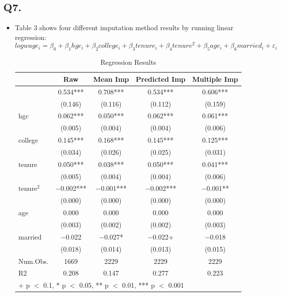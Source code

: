 \documentclass{article}
\begin{document}
\subsection*{Q7.}
	\begin{itemize}
		\item Table 3 shows four different imputation method results by running linear regression:
		\begin{equation}
			logwage_{i} = \beta_{0} + \beta_{1}hgc_{i} + \beta_{2}college_{i} + \beta_{3}tenure_{i} + \beta_{4}tenure^{2} + \beta_{5}age_{i} + \beta_{6}married_{i} + \varepsilon_{i}
		\end{equation}
		\begin{table}[h]
			\centering
			\caption{Regression Results}
			\begin{tabular}[t]{lcccc}\toprule  & Raw & Mean Imp & Predicted Imp & Multiple Imp\\\midrule(Intercept) & \num{0.534}*** & \num{0.708}*** & \num{0.534}*** & \num{0.606}***\\ & (\num{0.146}) & (\num{0.116}) & (\num{0.112}) & (\num{0.159})\\hgc & \num{0.062}*** & \num{0.050}*** & \num{0.062}*** & \num{0.061}***\\ & (\num{0.005}) & (\num{0.004}) & (\num{0.004}) & \vphantom{1} (\num{0.006})\\college & \num{0.145}*** & \num{0.168}*** & \num{0.145}*** & \num{0.125}***\\ & (\num{0.034}) & (\num{0.026}) & (\num{0.025}) & (\num{0.031})\\tenure & \num{0.050}*** & \num{0.038}*** & \num{0.050}*** & \num{0.041}***\\ & (\num{0.005}) & (\num{0.004}) & (\num{0.004}) & (\num{0.006})\\ tenure$^{2}$ & \num{-0.002}*** & \num{-0.001}*** & \num{-0.002}*** & \num{-0.001}**\\ & (\num{0.000}) & (\num{0.000}) & (\num{0.000}) & (\num{0.000})\\age & \num{0.000} & \num{0.000} & \num{0.000} & \num{0.000}\\ & (\num{0.003}) & (\num{0.002}) & (\num{0.002}) & (\num{0.003})\\married & \num{-0.022} & \num{-0.027}* & \num{-0.022}+ & \num{-0.018}\\ & (\num{0.018}) & (\num{0.014}) & (\num{0.013}) & (\num{0.015})\\\midrule
				Num.Obs. & \num{1669} & \num{2229} & \num{2229} & \num{2229}\\R2 & \num{0.208} & \num{0.147} & \num{0.277} & \num{0.223}\\\bottomrule\multicolumn{5}{l}{\rule{0pt}{1em}+ p $<$ 0.1, * p $<$ 0.05, ** p $<$ 0.01, *** p $<$ 0.001}\\

\end{tabular}
\end{table}
\end{itemize}
\end{document}
